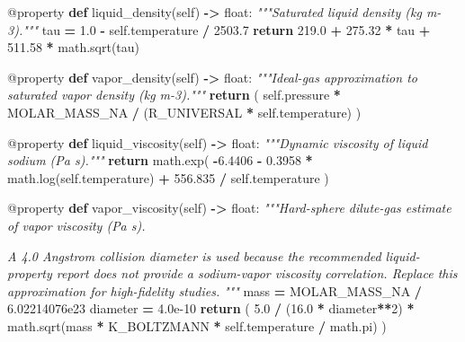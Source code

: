 \documentclass[
  12pt,a4paper,oneside]{report}
\newenvironment{Shaded}{\begin{snugshade}}{\end{snugshade}}
\newcommand{\AttributeTok}[1]{\textcolor[rgb]{0.77,0.63,0.00}{#1}}
\newcommand{\BuiltInTok}[1]{#1}
\newcommand{\CommentTok}[1]{\textcolor[rgb]{0.56,0.35,0.01}{\textit{#1}}}
\newcommand{\ControlFlowTok}[1]{\textcolor[rgb]{0.13,0.29,0.53}{\textbf{#1}}}
\newcommand{\DecValTok}[1]{\textcolor[rgb]{0.00,0.00,0.81}{#1}}
\newcommand{\FloatTok}[1]{\textcolor[rgb]{0.00,0.00,0.81}{#1}}
\newcommand{\KeywordTok}[1]{\textcolor[rgb]{0.13,0.29,0.53}{\textbf{#1}}}
\newcommand{\NormalTok}[1]{#1}
\newcommand{\OperatorTok}[1]{\textcolor[rgb]{0.81,0.36,0.00}{\textbf{#1}}}
\newcommand{\VariableTok}[1]{\textcolor[rgb]{0.00,0.00,0.00}{#1}}
\begin{document}
\begin{Shaded}
\begin{Highlighting}[]
    \AttributeTok{@property}
    \KeywordTok{def}\NormalTok{ liquid\_density(}\VariableTok{self}\NormalTok{) }\OperatorTok{{-}\textgreater{}} \BuiltInTok{float}\NormalTok{:}
        \CommentTok{"""Saturated liquid density (kg m{-}3)."""}
\NormalTok{        tau }\OperatorTok{=} \FloatTok{1.0} \OperatorTok{{-}} \VariableTok{self}\NormalTok{.temperature }\OperatorTok{/} \FloatTok{2503.7}
        \ControlFlowTok{return} \FloatTok{219.0} \OperatorTok{+} \FloatTok{275.32} \OperatorTok{*}\NormalTok{ tau }\OperatorTok{+} \FloatTok{511.58} \OperatorTok{*}\NormalTok{ math.sqrt(tau)}

    \AttributeTok{@property}
    \KeywordTok{def}\NormalTok{ vapor\_density(}\VariableTok{self}\NormalTok{) }\OperatorTok{{-}\textgreater{}} \BuiltInTok{float}\NormalTok{:}
        \CommentTok{"""Ideal{-}gas approximation to saturated vapor density (kg m{-}3)."""}
        \ControlFlowTok{return}\NormalTok{ (}
            \VariableTok{self}\NormalTok{.pressure }\OperatorTok{*}\NormalTok{ MOLAR\_MASS\_NA}
            \OperatorTok{/}\NormalTok{ (R\_UNIVERSAL }\OperatorTok{*} \VariableTok{self}\NormalTok{.temperature)}
\NormalTok{        )}

    \AttributeTok{@property}
    \KeywordTok{def}\NormalTok{ liquid\_viscosity(}\VariableTok{self}\NormalTok{) }\OperatorTok{{-}\textgreater{}} \BuiltInTok{float}\NormalTok{:}
        \CommentTok{"""Dynamic viscosity of liquid sodium (Pa s)."""}
        \ControlFlowTok{return}\NormalTok{ math.exp(}
            \OperatorTok{{-}}\FloatTok{6.4406} \OperatorTok{{-}} \FloatTok{0.3958} \OperatorTok{*}\NormalTok{ math.log(}\VariableTok{self}\NormalTok{.temperature)}
            \OperatorTok{+} \FloatTok{556.835} \OperatorTok{/} \VariableTok{self}\NormalTok{.temperature}
\NormalTok{        )}

    \AttributeTok{@property}
    \KeywordTok{def}\NormalTok{ vapor\_viscosity(}\VariableTok{self}\NormalTok{) }\OperatorTok{{-}\textgreater{}} \BuiltInTok{float}\NormalTok{:}
        \CommentTok{"""Hard{-}sphere dilute{-}gas estimate of vapor viscosity (Pa s).}

\CommentTok{        A 4.0 Angstrom collision diameter is used because the recommended}
\CommentTok{        liquid{-}property report does not provide a sodium{-}vapor viscosity}
\CommentTok{        correlation. Replace this approximation for high{-}fidelity studies.}
\CommentTok{        """}
\NormalTok{        mass }\OperatorTok{=}\NormalTok{ MOLAR\_MASS\_NA }\OperatorTok{/} \FloatTok{6.02214076e23}
\NormalTok{        diameter }\OperatorTok{=} \FloatTok{4.0e{-}10}
        \ControlFlowTok{return}\NormalTok{ (}
            \FloatTok{5.0} \OperatorTok{/}\NormalTok{ (}\FloatTok{16.0} \OperatorTok{*}\NormalTok{ diameter}\OperatorTok{**}\DecValTok{2}\NormalTok{)}
            \OperatorTok{*}\NormalTok{ math.sqrt(mass }\OperatorTok{*}\NormalTok{ K\_BOLTZMANN }\OperatorTok{*} \VariableTok{self}\NormalTok{.temperature }\OperatorTok{/}\NormalTok{ math.pi)}
\NormalTok{        )}


\end{Highlighting}
\end{Shaded}
\end{document}
